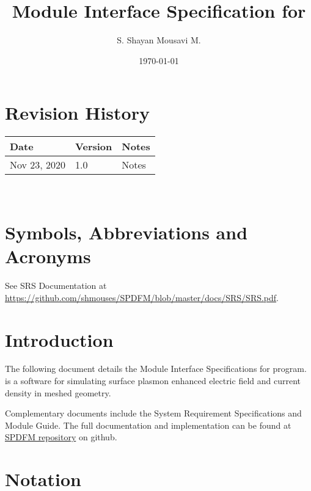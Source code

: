 \documentclass[12pt, titlepage]{article}
\begin{document}
	
	\title{Module Interface Specification for \progname{}}
	
	\author{S. Shayan Mousavi M.}
	
	\date{\today}
	
	\maketitle
	
	
	\section{Revision History}
	
	\begin{tabularx}{\textwidth}{p{3cm}p{2cm}X} \toprule {\bf Date} & {\bf Version}
		& {\bf Notes}\\ \midrule Nov 23, 2020 & 1.0 & Notes\\ \bottomrule \end{tabularx}
	
	~\newpage
	
	\section{Symbols, Abbreviations and Acronyms}
	
	See SRS Documentation at
	\url{https://github.com/shmouses/SPDFM/blob/master/docs/SRS/SRS.pdf}.
	
	
	\newpage
	
	\tableofcontents
	
	\newpage
	
	
	\section{Introduction}
	
	The following document details the Module Interface Specifications for
	\progname{} program. \progname{} is a software for simulating surface plasmon
	enhanced electric field and current density in meshed geometry.
	
	Complementary documents include the System Requirement Specifications and Module
	Guide.  The full documentation and implementation can be found at
	\href{https://github.com/shmouses/SPDFM}{SPDFM repository} on github.
	
	\section{Notation}
	
\end{document}
